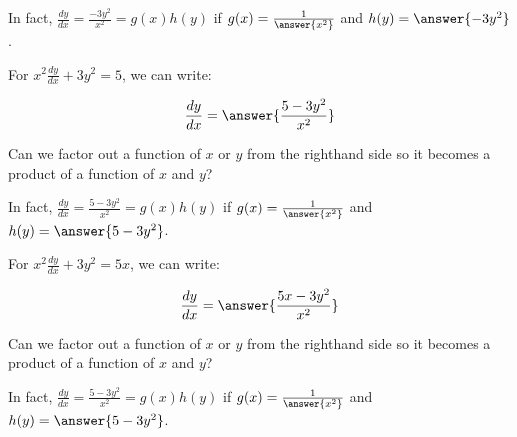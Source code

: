 \documentclass{ximera}
\begin{document}
\begin{exercise}
\begin{hint}
\begin{question}
In fact, $\frac{dy}{dx} =\frac{-3y^2}{x^2} = g(x)h(y)$ if $g(x) = \frac{1}{\answer{x^2}}$ and $h(y) = \answer{-3y^2}$.
\end{question}
\begin{question}
For $x^2\frac{dy}{dx} + 3y^2 = 5$, we can write:

\[
\frac{dy}{dx} = \answer{\frac{5-3y^2}{x^2}}
\]

Can we factor out a function of $x$ or $y$ from the righthand side so it becomes a product of a function of $x$ and $y$?
\begin{multipleChoice}
\end{multipleChoice}

In fact, $\frac{dy}{dx} =\frac{5-3y^2}{x^2} = g(x)h(y)$ if $g(x) = \frac{1}{\answer{x^2}}$ and $h(y) = \answer{5-3y^2}$.
\end{question}
\begin{question}
For $x^2\frac{dy}{dx} + 3y^2 = 5x$, we can write:

\[
\frac{dy}{dx} = \answer{\frac{5x-3y^2}{x^2}}
\]

Can we factor out a function of $x$ or $y$ from the righthand side so it becomes a product of a function of $x$ and $y$?
\begin{multipleChoice}
\end{multipleChoice}

In fact, $\frac{dy}{dx} =\frac{5-3y^2}{x^2} = g(x)h(y)$ if $g(x) = \frac{1}{\answer{x^2}}$ and $h(y) = \answer{5-3y^2}$.
\end{question}


\end{hint}
\end{exercise}
\end{document}

